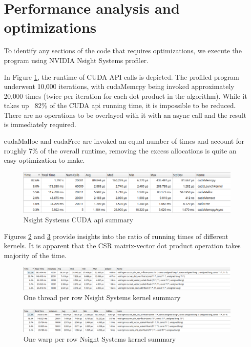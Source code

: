 \documentclass{article}
\begin{document}
\section{Performance analysis and optimizations}

To identify any sections of the code that requires optimizations,
we execute the program using NVIDIA Nsight Systems profiler.

In Figure \ref{img:nsight_cuda_api},
the runtime of CUDA API calls is depicted.
The profiled program underwent 10,000 iterations,
with cudaMemcpy being invoked approximately 20,000 times (twice per iteration for each dot product in the algorithm).
While it takes up ~82\% of the CUDA api running time, it is impossible to be reduced.
There are no operations to be overlayed with it with an async call and the result is immediately required.

cudaMalloc and cudaFree are invoked an equal number of times and account for roughly 7\% of the overall runtime,
removing the excess allocations is quite an easy optimization to make.

\begin{figure}[H]
\includegraphics[scale=0.9]{images/cuda_api_summary.png}
\caption{Nsight Systems CUDA api summary}
\label{img:nsight_cuda_api}
\end{figure}

Figures \ref{img:nsight_1thread} and \ref{img:nsight_warp}
provide insights into the ratio of running times of different kernels.
It is apparent that the CSR matrix-vector dot product operation takes majority of the time.

\begin{figure}[H]
\includegraphics[scale=0.6]{images/csr1_kernel_summary.png}
\caption{One thread per row Nsight Systems kernel summary}
\label{img:nsight_1thread}
\end{figure}

\begin{figure}[H]
\includegraphics[scale=0.6]{images/csr32_kernel_summary.png}
\caption{One warp per row Nsight Systems kernel summary}
\label{img:nsight_warp}
\end{figure}
\end{document}
